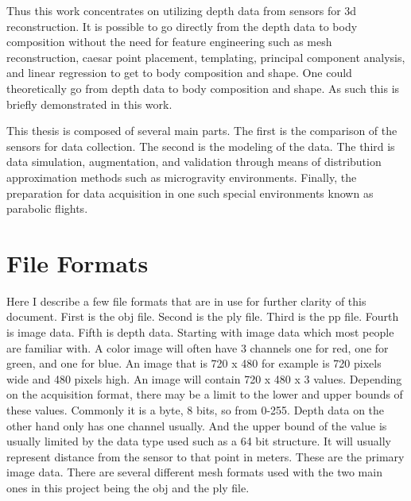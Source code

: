 Thus this work concentrates on utilizing depth data from sensors for 3d reconstruction. It is possible to go directly from the depth data to body composition without the need for feature engineering such as mesh reconstruction, caesar point placement, templating, principal component analysis, and linear regression to get to body composition and shape. One could theoretically go from depth data to body composition and shape. As such this is briefly demonstrated in this work.

This thesis is composed of several main parts. The first is the comparison of the sensors for data collection. The second is the modeling of the data. The third is data simulation, augmentation, and validation through means of distribution approximation methods such as microgravity environments. Finally, the preparation for data acquisition in one such special environments known as parabolic flights.
\section{File Formats}
Here I describe a few file formats that are in use for further clarity of this document. First is the obj file. Second is the ply file. Third is the pp file. Fourth is image data. Fifth is depth data. Starting with image data which most people are familiar with. A color image will often have 3 channels one for red, one for green, and one for blue. An image that is 720 x 480 for example is 720 pixels wide and 480 pixels high. An image will contain 720 x 480 x 3 values. Depending on the acquisition format, there may be a limit to the lower and upper bounds of these values. Commonly it is a byte, 8 bits, so from 0-255. Depth data on the other hand only has one channel usually. And the upper bound of the value is usually limited by the data type used such as a 64 bit structure. It will usually represent distance from the sensor to that point in meters. These are the primary image data. There are several different mesh formats used with the two main ones in this project being the obj and the ply file.


